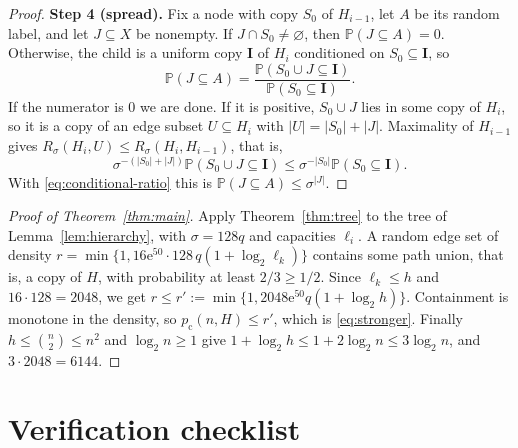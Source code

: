 \documentclass[11pt]{article}
\numberwithin{equation}{section}
\newcommand{\PP}{\mathbb P}
\newcommand{\pc}{p_{\mathrm c}}
\newcommand{\ee}{\mathrm e}
\newcommand{\Step}[1]{\par\smallskip\noindent\textbf{Step #1.}}
\begin{document}
\begin{proof}
\Step{4 (spread)} Fix a node with copy $S_0$ of $H_{i-1}$, let $A$ be its
random label, and let $J\subseteq X$ be nonempty. If
$J\cap S_0\ne\varnothing$, then $\PP(J\subseteq A)=0$. Otherwise, the child is
a uniform copy $\boldsymbol I$ of $H_i$ conditioned on
$S_0\subseteq\boldsymbol I$, so
\begin{equation}\label{eq:conditional-ratio}
 \PP(J\subseteq A)=
 \frac{\PP(S_0\cup J\subseteq\boldsymbol I)}
      {\PP(S_0\subseteq\boldsymbol I)} .
\end{equation}
If the numerator is $0$ we are done. If it is positive, $S_0\cup J$ lies in
some copy of $H_i$, so it is a copy of an edge subset $U\subseteq H_i$ with
$|U|=|S_0|+|J|$. Maximality of $H_{i-1}$ gives
$R_\sigma(H_i,U)\le R_\sigma(H_i,H_{i-1})$, that is,
\[
 \sigma^{-(|S_0|+|J|)}\PP(S_0\cup J\subseteq\boldsymbol I)
 \le \sigma^{-|S_0|}\PP(S_0\subseteq\boldsymbol I).
\]
With \eqref{eq:conditional-ratio} this is $\PP(J\subseteq A)\le\sigma^{|J|}$.
\end{proof}

\begin{proof}[Proof of Theorem~\ref{thm:main}]
Apply Theorem~\ref{thm:tree} to the tree of Lemma~\ref{lem:hierarchy}, with
$\sigma=128q$ and capacities $\ell_i$. A random edge set of density
$r=\min\{1,16\ee^{50}\cdot128\,q(1+\log_2\ell_k)\}$ contains some path union,
that is, a copy of $H$, with probability at least $2/3\ge1/2$. Since
$\ell_k\le h$ and $16\cdot128=2048$, we get
$r\le r':=\min\{1,2048\ee^{50}q(1+\log_2h)\}$. Containment is monotone in the
density, so $\pc(n,H)\le r'$, which is \eqref{eq:stronger}. Finally
$h\le\binom n2\le n^2$ and $\log_2n\ge1$ give
$1+\log_2h\le1+2\log_2n\le3\log_2n$, and $3\cdot2048=6144$.
\end{proof}

\section*{Verification checklist}
\end{document}

